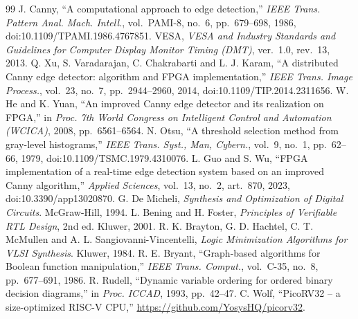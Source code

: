 \documentclass[11pt,a4paper]{article}
\begin{document}
\begin{thebibliography}{99}\small
{} J. Canny, ``A computational approach to edge detection,'' \emph{IEEE Trans. Pattern Anal. Mach. Intell.}, vol.~PAMI-8,
  no.~6, pp.~679--698, 1986, doi:10.1109/TPAMI.1986.4767851.
 VESA, \emph{VESA and Industry Standards and Guidelines for Computer Display Monitor Timing (DMT)}, ver.~1.0, rev.~13, 2013.
 Q. Xu, S. Varadarajan, C. Chakrabarti and L. J. Karam, ``A distributed Canny edge detector: algorithm and FPGA
  implementation,'' \emph{IEEE Trans. Image Process.}, vol.~23, no.~7, pp.~2944--2960, 2014, doi:10.1109/TIP.2014.2311656.
 W. He and K. Yuan, ``An improved Canny edge detector and its realization on FPGA,'' in \emph{Proc. 7th World Congress
  on Intelligent Control and Automation (WCICA)}, 2008, pp.~6561--6564.
 N. Otsu, ``A threshold selection method from gray-level histograms,'' \emph{IEEE Trans. Syst., Man, Cybern.}, vol.~9,
  no.~1, pp.~62--66, 1979, doi:10.1109/TSMC.1979.4310076.
 L. Guo and S. Wu, ``FPGA implementation of a real-time edge detection system based on an improved Canny algorithm,''
  \emph{Applied Sciences}, vol.~13, no.~2, art.~870, 2023, doi:10.3390/app13020870.
 G. De Micheli, \emph{Synthesis and Optimization of Digital Circuits}. McGraw-Hill, 1994.
 L. Bening and H. Foster, \emph{Principles of Verifiable RTL Design}, 2nd ed. Kluwer, 2001.
 R. K. Brayton, G. D. Hachtel, C. T. McMullen and A. L. Sangiovanni-Vincentelli, \emph{Logic Minimization Algorithms
  for VLSI Synthesis}. Kluwer, 1984.
 R. E. Bryant, ``Graph-based algorithms for Boolean function manipulation,'' \emph{IEEE Trans. Comput.}, vol.~C-35,
  no.~8, pp.~677--691, 1986.
 R. Rudell, ``Dynamic variable ordering for ordered binary decision diagrams,'' in \emph{Proc. ICCAD}, 1993, pp.~42--47.
 C. Wolf, ``PicoRV32 -- a size-optimized RISC-V CPU,'' \url{https://github.com/YosysHQ/picorv32}.
\end{thebibliography}

\appendix
\end{document}
